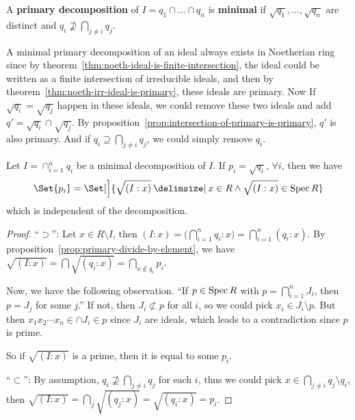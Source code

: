 \begin{definition}
  A {\bf primary decomposition} of $I = q_1 \cap \dots \cap q_n$ is {\bf minimal} if $\sqrt{q_1}, \dots, \sqrt{q_n}$
  are distinct and $q_i \not\supseteq \bigcap_{j \neq i} q_j$.
\end{definition}

A minimal primary decomposition of an ideal always exists in Noetherian ring since by
theorem~\ref{thm:noeth-ideal-is-finite-intersection}, the ideal could be written
as a finite intersection of irreducible ideals, and then by theorem~\ref{thm:noeth-irr-ideal-is-primary},
these ideals are primary. Now If $\sqrt{q_i} = \sqrt{q_j}$ happen in these ideals,
we could remove these two ideals and add $q' = \sqrt{q_i} \cap \sqrt{q_j}$.
By proposition~\ref{prop:intersection-of-primary-is-primary}, $q'$ is also primary.
And if $q_i \supseteq \bigcap_{j \neq i} q_j$, we could simply remove $q_i$.

\medskip

\begin{theorem}
  Let $I = \cap_{i = 1}^n q_i$ be a minimal decomposition of $I$.
  If $p_i = \sqrt{q_i}, \, \forall i$, then we have
  \[ \Set{p_i} = \Set[\Big ]{ \sqrt{(I: x)} \given x \in R \land \sqrt{(I: x)} \in \Spec R } \]
  which is independent of the decomposition.

  \begin{proof}
    ``$\supset$'': Let $x \in R \setminus I$, then $(I: x) = \big( \bigcap_{i=1}^n q_i : x \big)
    = \bigcap_{i = 1}^n (q_i: x)$. By proposition~\ref{prop:primary-divide-by-element},
    we have $\sqrt{(I: x)} = \bigcap \sqrt{(q_i: x)} = \bigcap_{x \notin q_i} p_i$.

    Now, we have the following observation. ``If $p \in \operatorname{Spec} R$ with $p = \bigcap_{i=1}^n J_i$,
    then $p = J_j$ for some $j$.'' If not, then $J_i \not\subset p$ for all $i$,
    so we could pick $x_i \in J_i \setminus p$.
    But then $x_1 x_2 \dotsm x_n \in \cap J_i \in p$ since $J_i$ are ideals,
    which leads to a contradiction since $p$ is prime.

    So if $\sqrt{(I: x)}$ is a prime, then it is equal to some $p_i$.

    ``$\subset$'': By assumption, $q_i \not\supseteq \bigcap_{j \neq i} q_j$ for each $i$,
    thus we could pick $x \in \bigcap_{j \neq i} q_j \setminus q_i$,
    then $\sqrt{(I: x)} = \bigcap_j \sqrt{(q_j: x)} = \sqrt{(q_i: x)} = p_i$.
  \end{proof}
\end{theorem}

